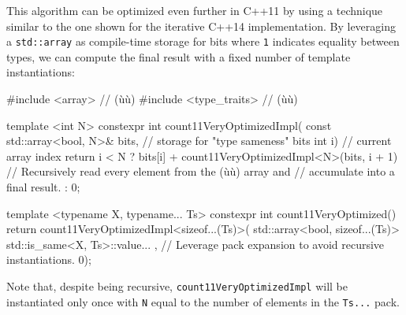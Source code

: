 \noindent This algorithm can be optimized even further in C++11 by using
a technique similar to the one shown for the iterative C++14
implementation. By leveraging a \lstinline!std::array! as compile-time
storage for bits where \lstinline!1! indicates equality between types, we can compute the final result with a fixed number of template
instantiations:

\begin{emcppslisting}
#include <array>        // (ù{}ù)
#include <type_traits>  // (ù{}ù)

template <int N>
constexpr int count11VeryOptimizedImpl(
    const std::array<bool, N>& bits,  // storage for "type sameness" bits
    int i)                            // current array index
{
    return i < N
        ? bits[i] + count11VeryOptimizedImpl<N>(bits, i + 1)
            // Recursively read every element from the (ù{}ù) array and
            // accumulate into a final result.
        : 0;
}

template <typename X, typename... Ts>
constexpr int count11VeryOptimized()
{
    return count11VeryOptimizedImpl<sizeof...(Ts)>(
        std::array<bool, sizeof...(Ts)>{ std::is_same<X, Ts>::value... },
            // Leverage pack expansion to avoid recursive instantiations.
        0);
}
\end{emcppslisting}

\noindent Note that, despite being recursive, \lstinline!count11VeryOptimizedImpl!
will be instantiated only once with \lstinline!N! equal to the number of
elements in the \lstinline!Ts...! pack.



